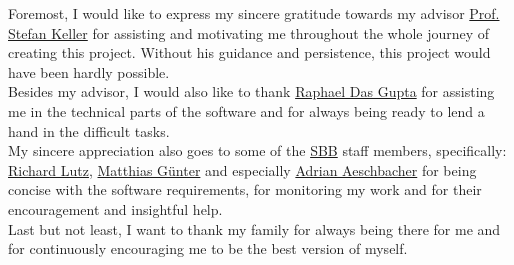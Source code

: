 Foremost, I would like to express my sincere gratitude towards my advisor \href{mailto:stefan.keller@hsr.ch}{Prof. Stefan Keller} for assisting and motivating me throughout the whole journey of creating this project. Without his guidance and persistence, this project would have been hardly possible.\\
Besides my advisor, I would also like to thank \href{mailto:raphael.das.gupta@hsr.ch}{Raphael Das Gupta} for assisting me in the technical parts of the software and for always being ready to lend a hand in the difficult tasks.\\
\newline
My sincere appreciation also goes to some of the \href{https://www.sbb.ch/en/home.html}{SBB} staff members, specifically: \href{mailto:richard.lutz@sbb.ch}{Richard Lutz}, \href{mailto:matthias.guenter@sbb.ch}{Matthias Günter} and especially \href{mailto:adrian.aeschbacher2@sbb.ch}{Adrian Aeschbacher} for being concise with the software requirements, for monitoring my work and for their encouragement and insightful help.\\
\newline
Last but not least, I want to thank my family for always being there for me and for continuously encouraging me to be the best version of myself.
